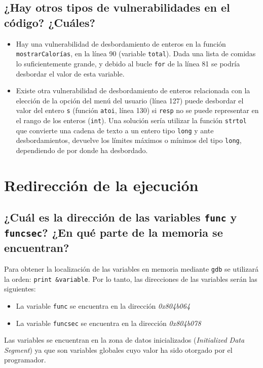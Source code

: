 \documentclass[10pt,a4paper]{article}
\begin{document}
\subsection{¿Hay otros tipos de vulnerabilidades en el código? ¿Cuáles?}
\begin{itemize}
\item Hay una vulnerabilidad de desbordamiento de enteros en la función \texttt{mostrarCalorías}, en la línea 90 (variable \texttt{total}). Dada una lista de comidas lo suficientemente grande, y debido al bucle \texttt{for} de la línea 81 se podría desbordar el valor de esta variable.
\item Existe otra vulnerabilidad de desbordamiento de enteros relacionada con la elección de la opción del menú del usuario (línea 127) puede desbordar el valor del entero \texttt{s} (función \texttt{atoi}, línea 130) si \texttt{resp} no se puede representar en el rango de los enteros (\texttt{int}). Una solución sería utilizar la función \texttt{strtol} que convierte una cadena de texto a un entero tipo \texttt{long} y ante desbordamientos, devuelve los límites máximos o mínimos del tipo \texttt{long}, dependiendo de por donde ha desbordado.
\end{itemize}


\newpage
\section{Redirección de la ejecución}

\subsection{¿Cuál es la dirección de las variables \texttt{func} y \texttt{funcsec}? ¿En qué parte de la memoria se encuentran?}

Para obtener la localización de las variables en memoria mediante \texttt{gdb} se utilizará la orden: \texttt{print \&{}variable}. Por lo tanto, las direcciones de las variables serán las siguientes:
\begin{itemize}
\item La variable \texttt{func} se encuentra en la dirección \emph{0x804b064}
\item La variable \texttt{funcsec} se encuentra en la dirección \emph{0x804b078}
\end{itemize}

Las variables se encuentran en la zona de datos inicializados (\emph{Initialized Data Segment}) ya que son variables globales cuyo valor ha sido otorgado por el programador.
\end{document}
